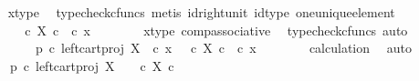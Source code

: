 \begin{isabellebody}
\ \ \ \ \ \ \isamarkupfalse%
\ x{\isacharunderscore}{\kern0pt}type\ \isamarkupfalse%
\ {\isacharparenleft}{\kern0pt}typecheck{\isacharunderscore}{\kern0pt}cfuncs{\isacharcomma}{\kern0pt}\ metis\ id{\isacharunderscore}{\kern0pt}right{\isacharunderscore}{\kern0pt}unit{}\ id{\isacharunderscore}{\kern0pt}type\ one{\isacharunderscore}{\kern0pt}unique{\isacharunderscore}{\kern0pt}element{\isacharparenright}{\kern0pt}\isanewline
\ \ \ \ \isamarkupfalse%
\ \isamarkupfalse%
\ {\isachardoublequoteopen}{\isachardot}{\kern0pt}{\isachardot}{\kern0pt}{\isachardot}{\kern0pt}\ {\isacharequal}{\kern0pt}\ {\isacharparenleft}{\kern0pt}{\isasymt}\ {\isasymcirc}\isactrlsub c\ {\isasymbeta}\isactrlbsub X\ {\isasymtimes}\isactrlsub c\ {\isasymone}\isactrlesub {\isacharparenright}{\kern0pt}\ {\isasymcirc}\isactrlsub c\ x{\isachardoublequoteclose}\isanewline
\ \ \ \ \ \ \isamarkupfalse%
\ x{\isacharunderscore}{\kern0pt}type\ comp{\isacharunderscore}{\kern0pt}associative{}\ \isamarkupfalse%
\ {\isacharparenleft}{\kern0pt}typecheck{\isacharunderscore}{\kern0pt}cfuncs{\isacharcomma}{\kern0pt}\ auto{\isacharparenright}{\kern0pt}\isanewline
\ \ \ \ \isanewline
\ \ \ \ \isamarkupfalse%
\ \isamarkupfalse%
\ {\isachardoublequoteopen}{\isacharparenleft}{\kern0pt}p\ {\isasymcirc}\isactrlsub c\ left{\isacharunderscore}{\kern0pt}cart{\isacharunderscore}{\kern0pt}proj\ X\ {\isasymone}{\isacharparenright}{\kern0pt}\ {\isasymcirc}\isactrlsub c\ x\ {\isacharequal}{\kern0pt}\ {\isacharparenleft}{\kern0pt}{\isasymt}\ {\isasymcirc}\isactrlsub c\ {\isasymbeta}\isactrlbsub X\ {\isasymtimes}\isactrlsub c\ {\isasymone}\isactrlesub {\isacharparenright}{\kern0pt}\ {\isasymcirc}\isactrlsub c\ x{\isachardoublequoteclose}\isanewline
\ \ \ \ \ \ \isamarkupfalse%
\ calculation\ \isamarkupfalse%
\ auto\isanewline
\ \ \isamarkupfalse%
\isanewline
\ \ \isamarkupfalse%
\ \isamarkupfalse%
\ {\isachardoublequoteopen}{\isacharparenleft}{\kern0pt}p\ {\isasymcirc}\isactrlsub c\ left{\isacharunderscore}{\kern0pt}cart{\isacharunderscore}{\kern0pt}proj\ X\ {\isasymone}{\isacharparenright}{\kern0pt}\isactrlsup {\isasymsharp}\ {\isacharequal}{\kern0pt}\ {\isacharparenleft}{\kern0pt}{\isasymt}\ {\isasymcirc}\isactrlsub c\ {\isasymbeta}\isactrlbsub X\ {\isasymtimes}\isactrlsub c\ {\isasymone}\isactrlesub {\isacharparenright}{\kern0pt}\isactrlsup {\isasymsharp}{\isachardoublequoteclose}\isanewline

\end{isabellebody}
